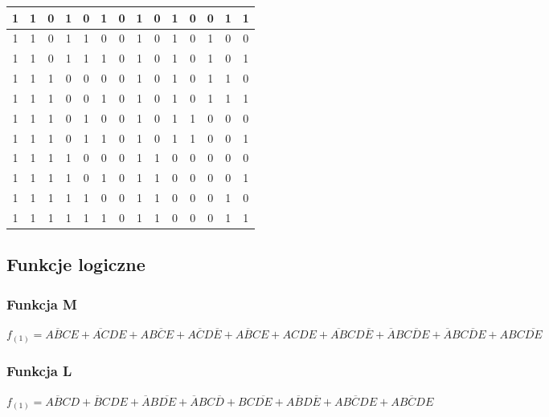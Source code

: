 \documentclass[a4paper]{article}
\begin{document}
\begin{center}
\begin{tabular}{|c|c|c|c|c|c||c|c|c|c|c|c|c|c|}
  \hline 1 & 1 & 0 & 1 & 0 & 1 & 0   &  	1 &	0 &	1 &	0 &	0	& 1	& 1 \\
  \hline 1 & 1 & 0 & 1 & 1 & 0 & 0   &  	1 &	0 &	1 &	0 &	1	& 0	& 0 \\
  \hline 1 & 1 & 0 & 1 & 1 & 1 & 0   &  	1 &	0 &	1 &	0 &	1	& 0	& 1 \\
  \hline 1 & 1 & 1 & 0 & 0 & 0 & 0   &  	1 &	0 &	1 &	0 &	1	& 1	& 0 \\
  \hline 1 & 1 & 1 & 0 & 0 & 1 & 0   &  	1 &	0 &	1 &	0 &	1	& 1	& 1 \\
  \hline 1 & 1 & 1 & 0 & 1 & 0 & 0   &  	1 &	0 &	1 &	1 &	0	& 0	& 0 \\
  \hline 1 & 1 & 1 & 0 & 1 & 1 & 0   &  	1 &	0 &	1 &	1 &	0	& 0	& 1 \\
  \hline 1 & 1 & 1 & 1 & 0 & 0 & 0   &  	1 &	1 &	0 &	0 &	0	& 0	& 0 \\
  \hline 1 & 1 & 1 & 1 & 0 & 1 & 0   &  	1 &	1 &	0 &	0 &	0	& 0	& 1 \\
  \hline 1 & 1 & 1 & 1 & 1 & 0 & 0   &  	1 &	1 &	0 &	0 &	0	& 1	& 0 \\
  \hline 1 & 1 & 1 & 1 & 1 & 1 & 0   &  	1 &	1 &	0 &	0 &	0	& 1	& 1 \\
  \hline 
  \end{tabular}
\end{center} 


\subsection{Funkcje logiczne}
\subsubsection{Funkcja M}
\begin{center}
  $f_{(1)} = 
    {\overline{ABC}E} +
    {\overline{AC}DE} + 
    {A\overline{BCE}} +
    {A\overline{C}D\overline{E}} +
    {A\overline{B}CE} +
    {ACDE}+
    {\overline{AB}CD\overline{E}} +
    {\overline{A}B\overline{CDE}} +
    {\overline{A}BC\overline{D}E} +
    {ABC\overline{DE}} $
\end{center}


\subsubsection{Funkcja L}
\begin{center}
  $f_{(1)} = 
  {\overline{ABC}D} + 
  {\overline{B}CDE} +
  {\overline{A}B\overline{DE}} +
  {\overline{A}BC\overline{D}} +
  {BC\overline{DE}} +
  {A\overline{B}D\overline{E}} +
  {A\overline{BCD}E} +
  {AB\overline{C}DE} $
\end{center}
\end{document}
